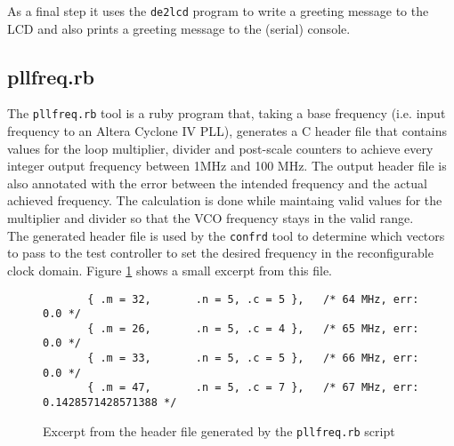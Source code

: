 As a final step it uses the \texttt{de2lcd} program to write a greeting message to the LCD
and also prints a greeting message to the (serial) console.


\subsection{pllfreq.rb}
The \texttt{pllfreq.rb} tool is a ruby program that, taking a base frequency (i.e. input
frequency to an Altera Cyclone IV PLL), generates a C header file that contains values
for the loop multiplier, divider and post-scale counters to achieve every integer
output frequency between 1MHz and 100 MHz. The output header file is also annotated with the
error between the intended frequency and the actual achieved frequency. The calculation
is done while maintaing valid values for the multiplier and divider so that the VCO
frequency stays in the valid range.
\\

The generated header file is used by the \texttt{confrd} tool to determine which vectors
to pass to the test controller to set the desired frequency in the reconfigurable
clock domain. Figure \ref{listing:pllfreq_h} shows a small excerpt from this file.

\begin{figure}[h!]
\lstset{basicstyle=\scriptsize\ttfamily}
\begin{lstlisting}
       { .m = 32,       .n = 5, .c = 5 },   /* 64 MHz, err: 0.0 */
       { .m = 26,       .n = 5, .c = 4 },   /* 65 MHz, err: 0.0 */
       { .m = 33,       .n = 5, .c = 5 },   /* 66 MHz, err: 0.0 */
       { .m = 47,       .n = 5, .c = 7 },   /* 67 MHz, err: 0.1428571428571388 */
\end{lstlisting}
\caption{Excerpt from the header file generated by the \texttt{pllfreq.rb} script}
\label{listing:pllfreq_h}
\end{figure}